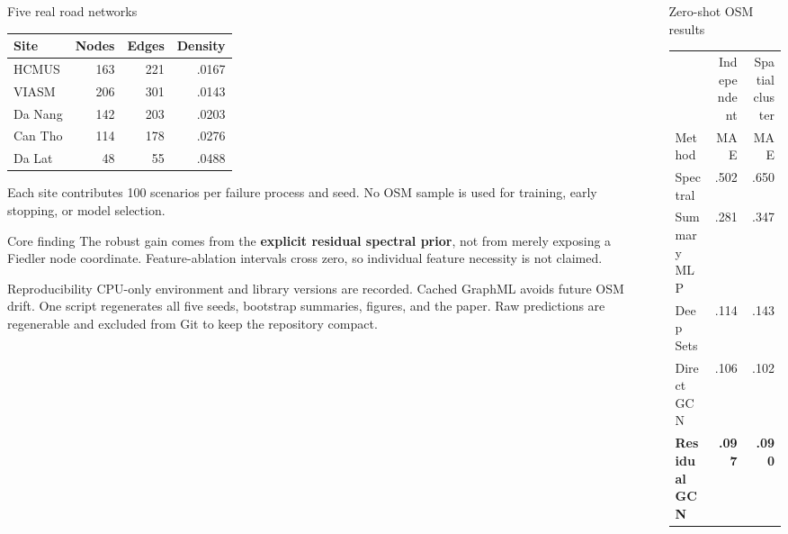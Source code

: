 \documentclass[final]{beamer}
\begin{document}
\begin{frame}[t]
\begin{columns}[t,totalwidth=.96\paperwidth]
\begin{column}{.32\paperwidth}
\begin{block}{Five real road networks}
\centering
\begin{tabular}{lrrr}
\toprule Site & Nodes & Edges & Density\\ \midrule
HCMUS & 163 & 221 & .0167\\
VIASM & 206 & 301 & .0143\\
Da Nang & 142 & 203 & .0203\\
Can Tho & 114 & 178 & .0276\\
Da Lat & 48 & 55 & .0488\\ \bottomrule
\end{tabular}
\vspace{.7cm}

Each site contributes 100 scenarios per failure process and seed. No OSM sample
is used for training, early stopping, or model selection.
\end{block}

\begin{exampleblock}{Core finding}
The robust gain comes from the \textbf{explicit residual spectral prior}, not
from merely exposing a Fiedler node coordinate. Feature-ablation intervals cross
zero, so individual feature necessity is not claimed.
\end{exampleblock}

\begin{block}{Reproducibility}
CPU-only environment and library versions are recorded. Cached GraphML avoids
future OSM drift. One script regenerates all five seeds, bootstrap summaries,
figures, and the paper. Raw predictions are regenerable and excluded from Git to
keep the repository compact.
\end{block}
\end{column}

\begin{column}{.31\paperwidth}
\begin{block}{Zero-shot OSM results}
\centering
\begin{tabular}{lrr}
\toprule & Independent & Spatial cluster\\
Method & MAE & MAE\\ \midrule
Spectral & .502 & .650\\
Summary MLP & .281 & .347\\
Deep Sets & .114 & .143\\
Direct GCN & .106 & .102\\
\textbf{Residual GCN} & \textbf{.097} & \textbf{.090}\\
\bottomrule
\end{tabular}
\vspace{.9cm}


\end{block}
\end{column}
\end{columns}
\end{frame}
\end{document}
